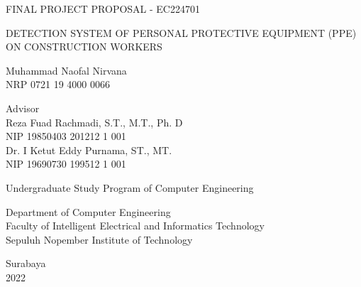 \begin{large}
  FINAL PROJECT PROPOSAL - EC224701
\end{large}

\vspace{\fill}

\begin{spacing}{1.5}
  \begin{Large}
    DETECTION SYSTEM OF PERSONAL PROTECTIVE EQUIPMENT (PPE) ON CONSTRUCTION WORKERS
  \end{Large}
\end{spacing}

\vspace{\fill}

\begin{large}
  Muhammad Naofal Nirvana \\
  \textnormal{NRP 0721 19 4000 0066}
\end{large}

\vspace{\fill}

\begin{large}
  \textnormal{Advisor} \\
  Reza Fuad Rachmadi, S.T., M.T., Ph. D \\
  \textnormal{NIP 19850403 201212 1 001} \\
  Dr. I Ketut Eddy Purnama, ST., MT. \\
  \textnormal{NIP 19690730 199512 1 001}
\end{large}

\vspace{\fill}

Undergraduate Study Program of Computer Engineering \\

\normalfont

Department of Computer Engineering \\
Faculty of Intelligent Electrical and Informatics Technology \\
Sepuluh Nopember Institute of Technology

Surabaya \\
2022

